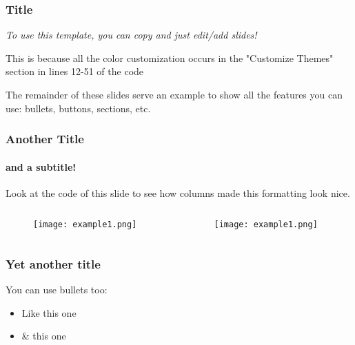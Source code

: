 \documentclass[
    11pt, 
    aspectratio=169, 
]{beamer}
\begin{document}
\begin{frame}
	\frametitle{Title}
            \emph{To use this template, you can copy and just edit/add slides!}\newline

            This is because all the color customization occurs in the "Customize Themes" section in lines 12-51 of the code\newline

            The remainder of these slides serve an example to show all the features you can use: bullets, buttons, sections, etc.
\end{frame}

\begin{frame}
	\frametitle{Another Title}
	\framesubtitle{and a subtitle!}
	
	Look at the code of this slide to see how columns made this formatting look nice.

	\begin{columns}[t] %
		\begin{column}{0.5\textwidth} %
                \begin{figure}[h!]
                    \centering
                    \texttt{[image: example1.png]}
                \end{figure}
		\end{column}
  		\begin{column}{0.5\textwidth} %
                \begin{figure}[h!]
                    \centering
                    \texttt{[image: example1.png]}
                \end{figure}
		\end{column}		
	\end{columns}
\end{frame}

\begin{frame}
	\frametitle{Yet another title}
            You can use bullets too:\newline
            \begin{itemize}
                \item Like this one\newline
                \item \& this one
            \end{itemize}
\end{frame}
\end{document}
